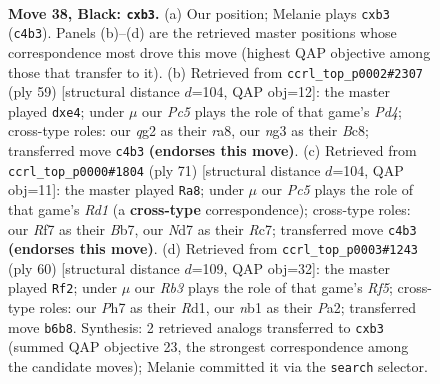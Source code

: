 \documentclass[11pt]{article}
\begin{document}
\clearpage

\begin{figure}[p]\centering
\begin{subfigure}{0.46\textwidth}\centering
\resizebox{\linewidth}{!}{%
\newchessgame
\chessboard[
  setfen={2b3k1/p1qn1r1p/1r3b2/P4P2/1ppp4/1P4N1/R3P1Q1/1NBK2R1 b - - 0 38},
  showmover=false,
  pgfstyle=straightmove, color=movearrow, markmove={c4-b3}
]}
\caption{}
\end{subfigure}\hfill
\begin{subfigure}{0.46\textwidth}\centering
\resizebox{\linewidth}{!}{%
\newchessgame
\chessboard[
  setfen={R1b4k/1rq2pp1/1r5p/3p3P/1npPP3/5P2/3QN1P1/R2B2K1 b - - 0 30},
  showmover=false,
  pgfstyle=straightmove, color=movearrow, markmove={d5-e4}
]}
\caption{}
\end{subfigure}
\\[4pt]
\begin{subfigure}{0.46\textwidth}\centering
\resizebox{\linewidth}{!}{%
\newchessgame
\chessboard[
  setfen={3r4/1br1qpnk/1p3bp1/1B1p4/1P1N3p/4PP1P/3R1BP1/1R1Q3K b - - 2 36},
  showmover=false,
  pgfstyle=straightmove, color=movearrow, markmove={d8-a8}
]}
\caption{}
\end{subfigure}\hfill
\begin{subfigure}{0.46\textwidth}\centering
\resizebox{\linewidth}{!}{%
\newchessgame
\chessboard[
  setfen={r3rnk1/3q1p2/bp4p1/p2pPR2/3N2P1/1P5P/P2Q2B1/3R2K1 w - - 0 31},
  showmover=false,
  pgfstyle=straightmove, color=movearrow, markmove={f5-f2}
]}
\caption{}
\end{subfigure}
\caption{\textbf{Move 38, Black: \texttt{cxb3}.} (a) Our position; Melanie plays \texttt{cxb3} (\texttt{c4b3}). Panels (b)--(d) are the retrieved master positions whose correspondence most drove this move (highest QAP objective among those that transfer to it). (b) Retrieved from \texttt{ccrl\_top\_p0002\#2307} (ply 59) [structural distance $d$=104, QAP obj=12]: the master played \texttt{dxe4}; under $\mu$ our \emph{Pc5} plays the role of that game's \emph{Pd4}; cross-type roles: our \emph{q}g2 as their \emph{r}a8, our \emph{n}g3 as their \emph{B}c8; transferred move \texttt{c4b3} \textbf{(endorses this move)}. (c) Retrieved from \texttt{ccrl\_top\_p0000\#1804} (ply 71) [structural distance $d$=104, QAP obj=11]: the master played \texttt{Ra8}; under $\mu$ our \emph{Pc5} plays the role of that game's \emph{Rd1} (a \textbf{cross-type} correspondence); cross-type roles: our \emph{R}f7 as their \emph{B}b7, our \emph{N}d7 as their \emph{R}c7; transferred move \texttt{c4b3} \textbf{(endorses this move)}. (d) Retrieved from \texttt{ccrl\_top\_p0003\#1243} (ply 60) [structural distance $d$=109, QAP obj=32]: the master played \texttt{Rf2}; under $\mu$ our \emph{Rb3} plays the role of that game's \emph{Rf5}; cross-type roles: our \emph{P}h7 as their \emph{R}d1, our \emph{n}b1 as their \emph{P}a2; transferred move \texttt{b6b8}. Synthesis: 2 retrieved analogs transferred to \texttt{cxb3} (summed QAP objective 23, the strongest correspondence among the candidate moves); Melanie committed it via the \texttt{search} selector.}
\label{fig:thought-m75}
\end{figure}
\end{document}
